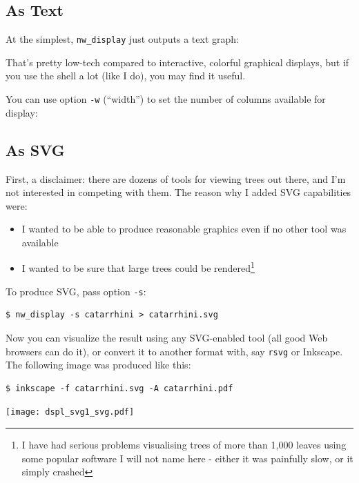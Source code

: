 \documentclass[a4paper,10pt]{report}
\newcommand{\svg}{\textsc{SVG}}
\newcommand{\display}{\texttt{nw\_display}}
\theoremstyle{definition}
\begin{document}
\subsection{As Text}
\label{sct_display_text}

At the simplest, \display{} just outputs a text graph:




That's pretty low-tech compared to interactive, colorful graphical displays, but if you use the shell a lot (like I do), you may find it useful.

You can use option \texttt{-w} (``width'') to set the number of columns available for display:




\subsection{As \svg}
\label{sct_display_svg}

First, a disclaimer: there are dozens of tools for viewing trees out there, and I'm not interested in competing with them. The reason why I added \svg{} capabilities were:
\begin{itemize}
 \item I wanted to be able to produce reasonable graphics even if no other tool was available
 \item I wanted to be sure that large trees could be rendered\footnote{I have had serious problems visualising trees of more than 1,000 leaves using some popular software I will not name here - either it was painfully slow, or it simply crashed} 
\end{itemize}

\noindent{}To produce \svg, pass option \texttt{-s}:
\begin{verbatim}
$ nw_display -s catarrhini > catarrhini.svg
\end{verbatim}

Now you can visualize the result using any \svg-enabled tool (all good Web browsers can do it), or convert it to another format with, say \texttt{rsvg} or Inkscape. The following image was produced like this:

\begin{verbatim}
$ inkscape -f catarrhini.svg -A catarrhini.pdf
\end{verbatim}

\begin{center}
 \texttt{[image: dspl\_svg1\_svg.pdf]}
\end{center}
\end{document}
